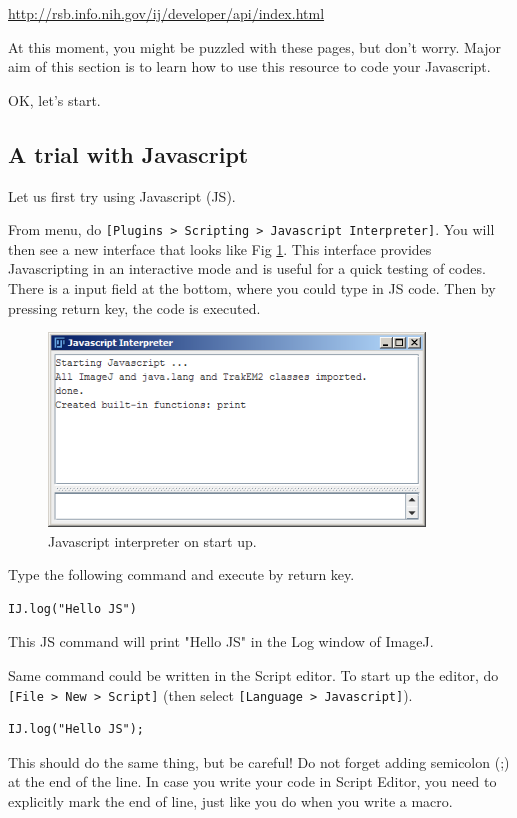 \documentclass[11pt,a4paper,oneside]{report}
\newcommand{\ijmenu}[1]{\texttt{\small#1}}
\begin{document}
\url{http://rsb.info.nih.gov/ij/developer/api/index.html}

At this moment, you might be puzzled with these pages, 
but don't worry. Major aim of this section is to learn how to use this resource 
to code your Javascript. 

OK, let's start. 

\subsection{A trial with Javascript}
%
Let us first try using Javascript (JS). 

From menu, do \ijmenu{[Plugins > Scripting > Javascript Interpreter]}. 
You will then see a new interface that looks like Fig \ref{fig:JSinterpreter}. 
This interface provides Javascripting in an interactive mode and is useful for 
a quick testing of codes. There is a input field at the bottom, where you could type in JS code. 
Then by pressing return key, the code is executed.  

\begin{figure}[htbp]
\begin{center}
\includegraphics[width=100mm]{fig2/JSinterpreterStasrtUp.png}
\caption{Javascript interpreter on start up.}
\label{fig:JSinterpreter}
\end{center}
\end{figure} 

Type the following command and execute by return key. 
\begin{lstlisting}[numbers=none]
IJ.log("Hello JS")
\end{lstlisting}
This JS command will print "Hello JS" in the Log window of ImageJ.  

Same command could be written in the Script editor. To start up the editor, 
do \ijmenu{[File > New > Script]} (then select \ijmenu{[Language > Javascript]}). 
\begin{lstlisting}[numbers=none]
IJ.log("Hello JS");
\end{lstlisting}
This should do the same thing, but be careful! Do not forget adding semicolon
(;) at the end of the line. In case you write your code in Script Editor, you need
to explicitly mark the end of line, just like you do when you write a macro.
\end{document}
